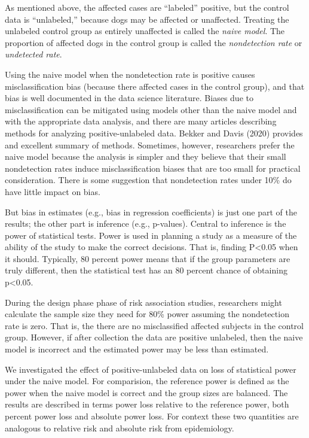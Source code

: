 \documentclass[
]{article}
\begin{document}
As mentioned above, the affected cases are ``labeled'' positive, but the
control data is ``unlabeled,'' because dogs may be affected or
unaffected. Treating the unlabeled control group as entirely unaffected
is called the \emph{naive model}. The proportion of affected dogs in the
control group is called the \emph{nondetection rate} or \emph{undetected
rate}.

Using the naive model when the nondetection rate is positive causes
misclassification bias (because there affected cases in the control
group), and that bias is well documented in the data science literature.
\cite{bd20} Biases due to misclassification can be mitigated using
models other than the naive model and with the appropriate data
analysis, and there are many articles describing methods for analyzing
positive-unlabeled data. Bekker and Davis (2020) provides and excellent
summary of methods. Sometimes, however, researchers prefer the naive
model because the analysis is simpler and they believe that their small
nondetection rates induce misclassification biases that are too small
for practical consideration. There is some suggestion that nondetection
rates under 10\% do have little impact on bias. \cite{bd20}

But bias in estimates (e.g., bias in regression coefficients) is just
one part of the results; the other part is inference (e.g., p-values).
Central to inference is the power of statistical tests. Power is used in
planning a study as a measure of the ability of the study to make the
correct decisions. That is, finding P\textless0.05 when it should.
Typically, 80 percent power means that if the group parameters are truly
different, then the statistical test has an 80 percent chance of
obtaining p\textless0.05.

During the design phase phase of risk association studies, researchers
might calculate the sample size they need for 80\% power assuming the
nondetection rate is zero. That is, the there are no misclassified
affected subjects in the control group. However, if after collection the
data are positive unlabeled, then the naive model is incorrect and the
estimated power may be less than estimated.

We investigated the effect of positive-unlabeled data on loss of
statistical power under the naive model. For comparision, the reference
power is defined as the power when the naive model is correct and the
group sizes are balanced. The results are described in terms power loss
relative to the reference power, both percent power loss and absolute
power loss. For context these two quantities are analogous to relative
risk and absolute risk from epidemiology.
\end{document}

